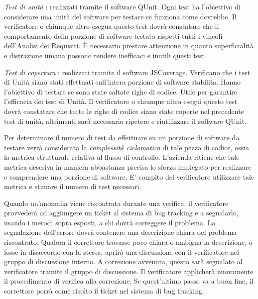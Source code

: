 \begin{elenconumerato}[\textbf{}]{\subsubsecindent}
\item \textit{Test di unit\`a}
: realizzati tramite il software QUnit. Ogni test ha l'obiettivo di considerare una unit\`a del software per testare se  funziona come dovrebbe. Il verificatore o chiunque altro esegua questo test dovr\`a constatare che il comportamento della porzione di software testato rispetti tutti i vincoli dell'Analisi dei Requisiti. \`E necessario prestare attenzione in quanto superficialit\`a e distrazione umana possono rendere inefficaci e inutili questi test.
\item \textit{Test di copertura}
: realizzati tramite il software JSCoverage. Verificano che i test di Unit\`a siano stati effettuati sull'intera porzione di software stabilita. Hanno l'obiettivo di testare se sono state saltate righe di codice. Utile per garantire l'efficacia dei test di Unit\`a. 
Il verificatore o chiunque altro esegui questo test dovr\`a constatare che tutte le righe di codice siano state coperte nel precedente test di unit\`a, altrimenti sar\`a necessario ripetere e riutilizzare il software QUnit.

\end{elenconumerato}

Per determinare il numero di test da effettuare su un porzione di software da testare verr\`a considerata la \textit{complessit\`a ciclomatica} di tale pezzo di codice, ossia la metrica strutturale relativa al flusso di controllo. L'azienda ritiene che tale metrica descriva in maniera abbastanza precisa lo sforzo impiegato per realizzare e comprendere una porzione di software. E' compito del verificatore utilizzare tale metrica e stimare il numero di test necessari.


 
 
Quando un'anomalia viene riscontrata durante una verifica, il verificatore provveder\`a ad aggiungere un ticket al sistema di bug tracking e a segnalarlo, usando i metodi sopra esposti, a chi dovr\`a correggere il problema. La segnalazione dell'errore dovr\`a contenere una descrizione chiara del problema riscontrato. Qualora il correttore trovasse poco chiara o ambigua la descrizione, o fosse in disaccordo con la stessa, aprir\`a una discussione con il verificatore nel gruppo di discussione interno. A correzione avvenuta, questo sar\`a segnalato al verificatore tramite il gruppo di discussione. Il verificatore applicher\`a nuovamente il procedimento di verifica alla correzione. Se quest'ultimo passo va a buon fine, il correttore porr\`a come risolto il ticket nel sistema di bug tracking.
 
